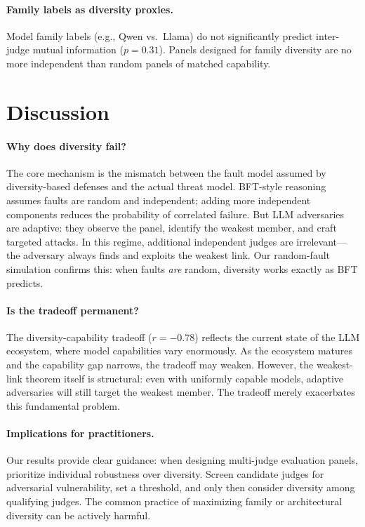 \documentclass[11pt]{article}
\begin{document}
\paragraph{Family labels as diversity proxies.} Model family labels (e.g., Qwen vs.\ Llama) do not significantly predict inter-judge mutual information ($p = 0.31$). Panels designed for family diversity are no more independent than random panels of matched capability.

\section{Discussion}

\paragraph{Why does diversity fail?}
The core mechanism is the mismatch between the fault model assumed by diversity-based defenses and the actual threat model. BFT-style reasoning assumes faults are random and independent; adding more independent components reduces the probability of correlated failure. But LLM adversaries are adaptive: they observe the panel, identify the weakest member, and craft targeted attacks. In this regime, additional independent judges are irrelevant---the adversary always finds and exploits the weakest link. Our random-fault simulation confirms this: when faults \emph{are} random, diversity works exactly as BFT predicts.

\paragraph{Is the tradeoff permanent?}
The diversity-capability tradeoff ($r = -0.78$) reflects the current state of the LLM ecosystem, where model capabilities vary enormously. As the ecosystem matures and the capability gap narrows, the tradeoff may weaken. However, the weakest-link theorem itself is structural: even with uniformly capable models, adaptive adversaries will still target the weakest member. The tradeoff merely exacerbates this fundamental problem.

\paragraph{Implications for practitioners.}
Our results provide clear guidance: when designing multi-judge evaluation panels, prioritize individual robustness over diversity. Screen candidate judges for adversarial vulnerability, set a threshold, and only then consider diversity among qualifying judges. The common practice of maximizing family or architectural diversity can be actively harmful.
\end{document}
